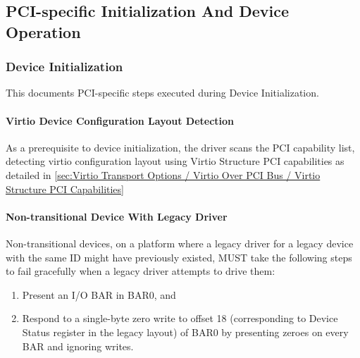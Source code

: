 \subsection{PCI-specific Initialization And Device Operation}\label{sec:Virtio Transport Options / Virtio Over PCI Bus / PCI-specific Initialization And Device Operation}

\subsubsection{Device Initialization}\label{sec:Virtio Transport Options / Virtio Over PCI Bus / PCI-specific Initialization And Device Operation / Device Initialization}

This documents PCI-specific steps executed during Device Initialization.

\paragraph{Virtio Device Configuration Layout Detection}\label{sec:Virtio Transport Options / Virtio Over PCI Bus / PCI-specific Initialization And Device Operation / Device Initialization / Virtio Device Configuration Layout Detection}

As a prerequisite to device initialization, the driver scans the
PCI capability list, detecting virtio configuration layout using Virtio
Structure PCI capabilities as detailed in \ref{sec:Virtio Transport Options / Virtio Over PCI Bus / Virtio Structure PCI Capabilities}

\paragraph{Non-transitional Device With Legacy Driver}\label{sec:Virtio Transport Options / Virtio Over PCI Bus / PCI-specific Initialization And Device Operation / Device Initialization / Non-transitional Device With Legacy Driver}


Non-transitional devices, on a platform where a legacy driver for
a legacy device with the same ID might have previously existed,
MUST take the following steps to fail gracefully when a legacy
driver attempts to drive them:

\begin{enumerate}
\item Present an I/O BAR in BAR0, and
\item Respond to a single-byte zero write to offset 18
   (corresponding to Device Status register in the legacy layout)
   of BAR0 by presenting zeroes on every BAR and ignoring writes.
\end{enumerate}

